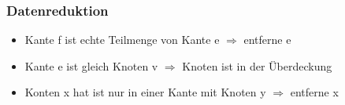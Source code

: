 \documentclass[ngerman]{scrartcl}
\begin{document}
\subsubsection{Datenreduktion}
\begin{itemize}
  \item Kante f ist echte Teilmenge von Kante e $ \Rightarrow $ entferne e
  \item Kante e ist gleich Knoten v $ \Rightarrow $ Knoten ist in der Überdeckung
  \item Konten x hat ist nur in einer Kante mit Knoten y $ \Rightarrow $ entferne x
\end{itemize}
\end{document}
